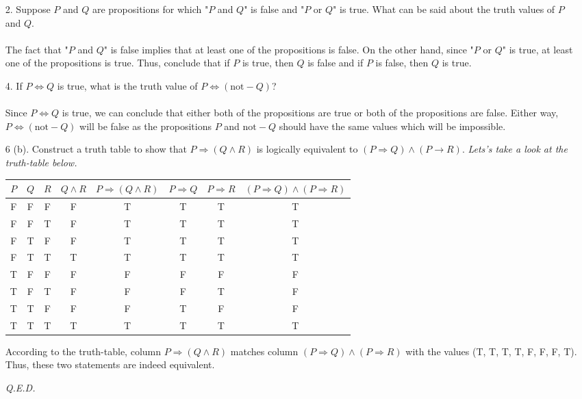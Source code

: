 \documentclass[12pt, a4paper]{article}                  %
\begin{document}
\begin{enumerate}
\item[2.]
Suppose $P$ and $Q$ are propositions for which "$P$ and $Q$" is false and "$P$ or $Q$" is true.
What can be said about the truth values of $P$ and $Q$.\\\\
The fact that "$P$ and $Q$" is false implies that at least one of the propositions is false.
On the other hand, since "$P$ or $Q$" is true, at least one of the propositions is true.
Thus, conclude that if $P$ is true, then $Q$ is false and if $P$ is false, then $Q$ is true.
\item[4.]
If $P \iff Q$ is true, what is the truth value of $P \iff (\text{not}-Q)$?\\\\
Since $P \iff Q$ is true, we can conclude that either both of the propositions are true
or both of the propositions are false. Either way, $P \iff (\text{not}-Q)$ will be false
as the propositions $P$ and $\text{not}-Q$ should have the same values which will be impossible.
\\
\item[6 (b).]
Construct a truth table to show that $P \Rightarrow (Q \wedge R)$ is logically equivalent to $(P \Rightarrow Q) \wedge (P \rightarrow R)$.
\textit{Lets's take a look at the truth-table below.}

\begin{table}[h!]
	\centering
	\begin{adjustbox}{max width=\textwidth}
	\resizebox{0.95\linewidth}{!}
	{
		\begin{tabular}{*{8}{|c}|}
		\hline
		$P$ & $Q$ & $R$ & $Q \wedge R$ & $P \Rightarrow (Q \wedge R)$ & $P \Rightarrow Q$ & $P \Rightarrow R$ & $(P \Rightarrow Q) \wedge (P \Rightarrow R)$\\ \hline
		F & F & F & F & T & T & T & T\\ \hline
		F & F & T & F & T & T & T & T\\ \hline
		F & T & F & F & T & T & T & T\\ \hline
		F & T & T & T & T & T & T & T\\ \hline
        T & F & F & F & F & F & F & F\\ \hline
        T & F & T & F & F & F & T & F\\ \hline
        T & T & F & F & F & T & F & F\\ \hline
        T & T & T & T & T & T & T & T\\
        \hline
	\end{tabular}
    }
	\end{adjustbox}
\end{table}
According to the truth-table, column $P \Rightarrow (Q \wedge R)$ matches column $(P \Rightarrow Q) \wedge (P \Rightarrow R)$ with the values (T, T, T, T, F, F, F, T).
Thus, these two statements are indeed equivalent.
\begin{flushright}
\textit{Q.E.D.}
\end{flushright}


\end{enumerate}
\end{document}
